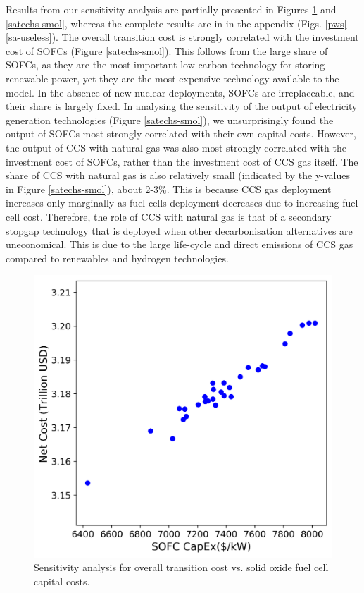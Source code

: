 Results from our sensitivity analysis are partially presented in Figures \ref{syscost-smol} and \ref{satechs-smol}, whereas the complete results are in in the appendix (Figs. \ref{pws}-\ref{sa-useless}). The overall transition cost is strongly correlated with the investment cost of \gls{SOFC}s (Figure \ref{satechs-smol}). This follows from the large share of \gls{SOFC}s, as they are the most important low-carbon technology for storing renewable power, yet they are the most expensive technology available to the model. In the absence of new nuclear deployments, \glspl{SOFC} are irreplaceable, and their share is largely fixed. In analysing the sensitivity of the output of electricity generation technologies (Figure \ref{satechs-smol}), we unsurprisingly found the output of \gls{SOFC}s most strongly correlated with their own capital costs. However, the output of \gls{CCS} with natural gas was also most strongly correlated with the investment cost of \gls{SOFC}s, rather than the investment cost of CCS gas itself. The share of \gls{CCS} with natural gas is also relatively small (indicated by the y-values in Figure \ref{satechs-smol}), about 2-3\%.  This is because CCS gas deployment increases only marginally as fuel cells deployment decreases due to increasing fuel cell cost. Therefore, the role of CCS with natural gas is that of a secondary stopgap technology that is deployed when other decarbonisation alternatives are uneconomical. This is due to the large life-cycle and direct emissions of CCS gas compared to renewables and hydrogen technologies.

\begin{figure}[H] 
\centering
\hspace*{-1cm}
\includegraphics[scale=0.7]{figures/syscost_abbrv}
\caption{Sensitivity analysis for overall transition cost vs. solid oxide fuel cell capital costs.}
\label{syscost-smol}
\end{figure}

